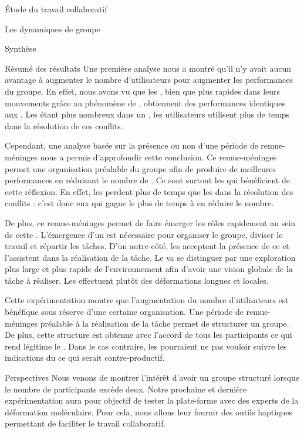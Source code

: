 \documentclass[myfrancais]{mythesis}
\begin{document}
\begin{mypart}{Étude du travail collaboratif}
\begin{mychapter}{Les dynamiques de groupe}
\begin{mysection}{Synthèse}
\begin{mysubsection}{Résumé des résultats}
					Une première analyse nous a montré qu'il n'y avait aucun avantage à augmenter le nombre d'utilisateurs pour augmenter les performances du groupe.
					En effet, nous avons vu que les , bien que plus rapides dans leurs mouvements grâce au phénomène de , obtiennent des performances identiques aux .
					Les  étant plus nombreux dans un , les utilisateurs utilisent plus de temps dans la résolution de ces conflits.

					Cependant, une analyse basée sur la présence ou non d'une période de remue-méninges nous a permis d'approfondir cette conclusion.
					Ce remue-méninges permet une organisation préalable du groupe afin de produire de meilleures performances en réduisant le nombre de .
					Ce sont surtout les  qui bénéficient de cette réflexion.
					En effet, les  perdent plus de temps que les  dans la résolution des conflits : c'est donc eux qui gagne le plus de temps à en réduire le nombre.

					De plus, ce remue-méninges permet de faire émerger les rôles rapidement au sein de cette .
					L'émergence d'un  est nécessaire pour organiser le groupe, diviser le travail et répartir les tâches.
					D'un autre côté, les  acceptent la présence de ce  et l'assistent dans la réalisation de la tâche.
					Le  va se distinguer par une exploration plus large et plus rapide de l'environnement afin d'avoir une vision globale de la tâche à réaliser.
					Les  effectuent plutôt des déformations longues et locales.

					Cette expérimentation montre que l'augmentation du nombre d'utilisateurs est bénéfique sous réserve d'une certaine organisation.
					Une période de remue-méninges préalable à la réalisation de la tâche permet de structurer un groupe.
					De plus, cette structure est obtenue avec l'accord de tous les participants ce qui rend légitime le .
					Dans le cas contraire, les  pourraient ne pas vouloir suivre les indications du  ce qui serait contre-productif.
				\end{mysubsection}
				\begin{mysubsection}{Perspectives}
					Nous venons de montrer l'intérêt d'avoir un groupe structuré lorsque le nombre de participants excède deux.
					Notre prochaine et dernière expérimentation aura pour objectif de tester la plate-forme avec des experts de la déformation moléculaire.
					Pour cela, nous allons leur fournir des outils haptiques permettant de faciliter le travail collaboratif.


\end{mysubsection}
\end{mysection}
\end{mychapter}
\end{mypart}
\end{document}
